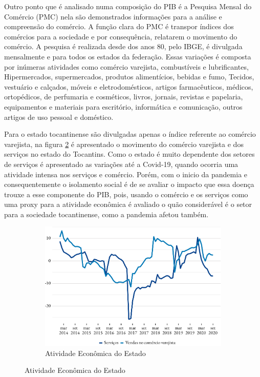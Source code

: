 \par Outro ponto que é analisado numa composição do PIB é a Pesquisa Mensal do Comércio (PMC) nela são demonstrados informações para a análise e compreensão do comércio. A função clara do PMC é transpor índices dos comércios para a sociedade e por consequência, relatarem o movimento do comércio. A pesquisa é realizada desde dos anos 80, pelo IBGE, é divulgada mensalmente e para todos os estados da federação. Essas variações é composta por inúmeras atividades como comércio varejista, combustíveis e lubrificantes, Hipermercados, supermercados, produtos alimentícios, bebidas e fumo, Tecidos, vestuário e calçados, móveis e eletrodomésticos, artigos farmacêuticos, médicos, ortopédicos, de perfumaria e cosméticos, livros, jornais, revistas e papelaria, equipamentos e materiais para escritório, informática e comunicação, outros artigos de uso pessoal e doméstico.

\par Para o estado tocantinense são divulgadas apenas o índice referente ao comércio varejista, na figura \ref{fig:pmc} é apresentado o movimento do comércio varejista e dos serviços no estado do Tocantins. Como o estado é muito dependente dos setores de serviços é apresentado as variações até a Covid-19, quando ocorria uma atividade intensa nos serviços e comércio. Porém, com o inicio da pandemia e consequentemente o isolamento social é de se avaliar o impacto que essa doença trouxe a esse componente do PIB, pois, usando o comércio e os serviços como uma proxy para a atividade econômica é avaliado o quão considerável é o setor para a sociedade tocantinense, como a pandemia afetou também.

\begin{figure}[!h]
	\begin{subfigure}{\linewidth}
		\caption{Atividade Econômica do Estado}
		\label{fig:pmc}
		\includegraphics{fig/pmc_ibge-1.pdf}
	\end{subfigure}
\end{figure}
